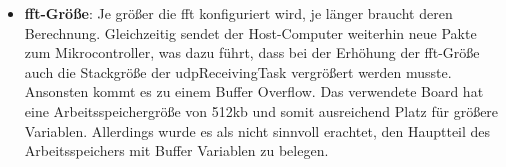 \documentclass[../EDF Master Thesis.tex]{subfiles}
\begin{document}
\begin{itemize}
        \item \textbf{\ac{fft}-Größe}: Je größer die \ac{fft} konfiguriert wird, je länger braucht deren Berechnung.
            Gleichzeitig sendet der Host-Computer weiterhin neue Pakte zum Mikrocontroller, was dazu führt, dass bei der Erhöhung der \ac{fft}-Größe auch die Stackgröße der udpReceivingTask vergrößert werden musste.
            Ansonsten kommt es zu einem Buffer Overflow.
            Das verwendete Board hat eine Arbeitsspeichergröße von 512kb und somit ausreichend Platz für größere Variablen.
            Allerdings wurde es als nicht sinnvoll erachtet, den Hauptteil des Arbeitsspeichers mit Buffer Variablen zu belegen.
    \end{itemize}
\end{document}
